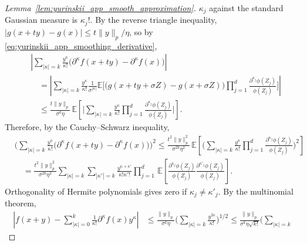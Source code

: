 \documentclass[11pt,lof]{puthesis}
\newcommand{\E}{\ensuremath{\mathbb{E}}}
\theoremstyle{break}
\theoremstyle{proof}
\newtheorem{proof}{Proof}
\begin{document}
\begin{proof}[Lemma~\ref{lem:yurinskii_app_smooth_approximation}]
  $\kappa_j$ against the standard Gaussian measure is $\kappa_j!$. By the
  reverse triangle inequality, $|g(x + t y) - g(x)| \leq t \|y\|_p / \eta$,
  so by \eqref{eq:yurinskii_app_smoothing_derivative},
  \begin{align*}
    &\left|
      \sum_{|\kappa|=k}
      \frac{y^\kappa}{\kappa!}
      \big(
        \partial^{\kappa} f(x + t y)
        - \partial^{\kappa} f(x)
      \big)
    \right| \\
    &\quad=
    \left|
      \sum_{|\kappa|=k}
      \frac{y^\kappa}{\kappa!}
      \frac{1}{\sigma^{|\kappa|}}
      \E \Bigg[
        \big(
          g(x + t y + \sigma Z)
          - g(x + \sigma Z)
        \big)
        \prod_{j=1}^{d}
        \frac{\partial^{\kappa_j}\phi(Z_j)}{\phi(Z_j)}
      \Bigg]
    \right| \\
    &\quad\leq
    \frac{t \|y\|_p}{\sigma^k \eta}
    \, \E \left[
      \Bigg|
      \sum_{|\kappa|=k}
      \frac{y^\kappa}{\kappa!}
      \prod_{j=1}^{d}
      \frac{\partial^{\kappa_j}\phi(Z_j)}{\phi(Z_j)}
      \Bigg|
    \right].
  \end{align*}
  Therefore, by the Cauchy--Schwarz inequality,
  \begin{align*}
    &\Bigg(
      \sum_{|\kappa|=k}
      \frac{y^\kappa}{\kappa!}
      \big(
        \partial^{\kappa} f(x + t y)
        - \partial^{\kappa} f(x)
      \big)
    \Bigg)^2
    \leq
    \frac{t^2 \|y\|_p^2}{\sigma^{2k} \eta^2}
    \, \E \left[
      \Bigg(
        \sum_{|\kappa|=k}
        \frac{y^\kappa}{\kappa!}
        \prod_{j=1}^{d}
        \frac{\partial^{\kappa_j} \phi(Z_j)}{\phi(Z_j)}
      \Bigg)^2
    \right] \\
    &\quad=
    \frac{t^2 \|y\|_p^2}{\sigma^{2k} \eta^2}
    \sum_{|\kappa|=k}
    \sum_{|\kappa'|=k}
    \frac{y^{\kappa + \kappa'}}{\kappa! \kappa'!}
    \prod_{j=1}^{d}
    \, \E \left[
      \frac{\partial^{\kappa_j} \phi(Z_j)}{\phi(Z_j)}
      \frac{\partial^{\kappa'_j} \phi(Z_j)}{\phi(Z_j)}
    \right].
  \end{align*}
  Orthogonality of Hermite polynomials gives zero if
  $\kappa_j \neq \kappa'_j$. By the multinomial theorem,
  \begin{align*}
    \left|
      f(x + y)
      - \sum_{|\kappa|=0}^{k}
      \frac{1}{\kappa!}
      \partial^{\kappa} f(x)
      y^\kappa
    \right|
    &\leq
    \frac{\|y\|_p}{\sigma^k \eta}
    \Bigg(
      \sum_{|\kappa|=k}
      \frac{y^{2 \kappa}}{\kappa!}
    \Bigg)^{1/2}
    \leq
    \frac{\|y\|_p}{\sigma^k \eta \sqrt{k!}}
    \Bigg(
      \sum_{|\kappa|=k}

\end{align*}
\end{proof}
\end{document}
